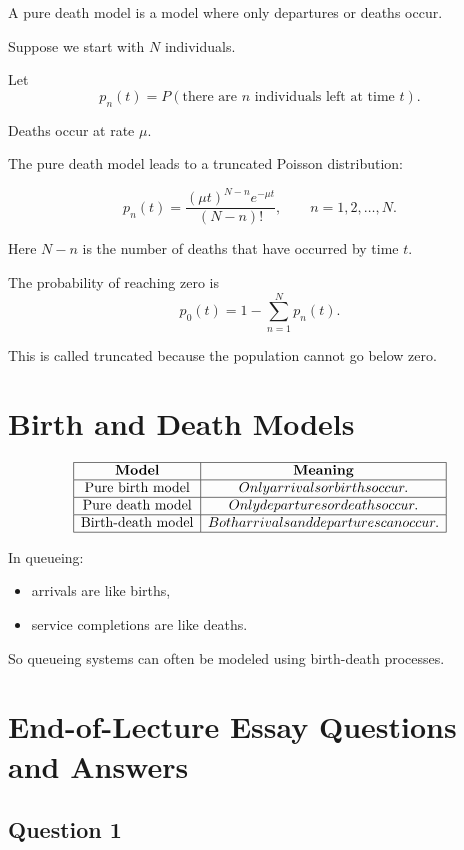 \documentclass[12pt]{article}
\begin{document}
A pure death model is a model where only departures or deaths occur.

Suppose we start with \(N\) individuals.

Let
\[
p_n(t)=P(\text{there are }n\text{ individuals left at time }t).
\]

Deaths occur at rate \(\mu\).

The pure death model leads to a truncated Poisson distribution:

\[
\boxed{
p_n(t)=\frac{(\mu t)^{N-n}e^{-\mu t}}{(N-n)!},
\qquad n=1,2,\ldots,N.
}
\]

Here \(N-n\) is the number of deaths that have occurred by time \(t\).

The probability of reaching zero is
\[
\boxed{
p_0(t)=1-\sum_{n=1}^{N}p_n(t).
}
\]

This is called truncated because the population cannot go below zero.

\section{Birth and Death Models}

\[
\begin{array}{|c|c|}
\hline
\textbf{Model} & \textbf{Meaning}\\
\hline
\text{Pure birth model} & Only arrivals or births occur.\\
\hline
\text{Pure death model} & Only departures or deaths occur.\\
\hline
\text{Birth-death model} & Both arrivals and departures can occur.\\
\hline
\end{array}
\]

In queueing:

\begin{itemize}
    \item arrivals are like births,
    \item service completions are like deaths.
\end{itemize}

So queueing systems can often be modeled using birth-death processes.

\section{End-of-Lecture Essay Questions and Answers}

\subsection*{Question 1}
\end{document}
